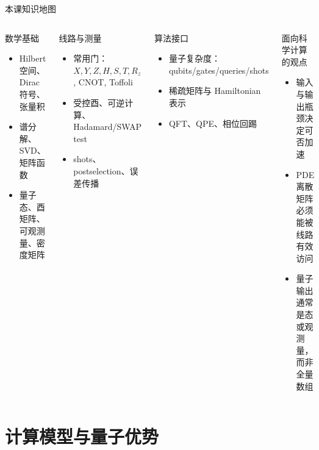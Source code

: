 \documentclass[aspectratio=169,10pt]{ctexbeamer}
\begin{document}
\begin{frame}{本课知识地图}
\begin{columns}[T,totalwidth=\textwidth]
\begin{keybox}{数学基础}
\begin{itemize}
\item Hilbert 空间、Dirac 符号、张量积
\item 谱分解、SVD、矩阵函数
\item 量子态、酉矩阵、可观测量、密度矩阵
\end{itemize}
\end{keybox}
\begin{keybox}{线路与测量}
\begin{itemize}
\item 常用门：$X,Y,Z,H,S,T,R_z$, CNOT, Toffoli
\item 受控酉、可逆计算、Hadamard/SWAP test
\item shots、postselection、误差传播
\end{itemize}
\end{keybox}
\begin{keybox}{算法接口}
\begin{itemize}
\item 量子复杂度：qubits/gates/queries/shots
\item 稀疏矩阵与 Hamiltonian 表示
\item QFT、QPE、相位回踢
\end{itemize}
\end{keybox}
\begin{keybox}{面向科学计算的观点}
\begin{itemize}
\item 输入与输出瓶颈决定可否加速
\item PDE 离散矩阵必须能被线路有效访问
\item 量子输出通常是态或观测量，而非全量数组
\end{itemize}
\end{keybox}
\end{columns}
\end{frame}

\section{计算模型与量子优势}
\end{document}
